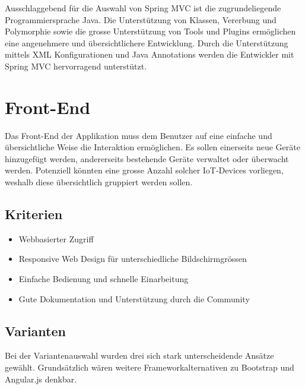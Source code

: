 Ausschlaggebend für die Auswahl von Spring MVC ist die zugrundeliegende Programmiersprache Java. Die Unterstützung von Klassen, Vererbung und Polymorphie sowie die grosse Unterstützung von Tools und Plugins ermöglichen eine angenehmere und übersichtlichere Entwicklung. Durch die Unterstützung mittels XML Konfigurationen und Java Annotations werden die Entwickler mit Spring MVC hervorragend unterstützt.

\newpage
\section{Front-End}
Das Front-End der Applikation muss dem Benutzer auf eine einfache und übersichtliche Weise die Interaktion ermöglichen. Es sollen einerseits neue Geräte hinzugefügt werden, andererseits bestehende Geräte verwaltet oder überwacht werden. Potenziell könnten eine grosse Anzahl solcher IoT-Devices vorliegen, weshalb diese übersichtlich gruppiert werden sollen.

\subsection{Kriterien}
\begin{itemize}
\item Webbasierter Zugriff
\item Responsive Web Design für unterschiedliche Bildschirmgrössen
\item Einfache Bedienung und schnelle Einarbeitung
\item Gute Dokumentation und Unterstützung durch die Community
\end{itemize}

\subsection{Varianten}
Bei der Variantenauswahl wurden drei sich stark unterscheidende Ansätze gewählt. Grundsätzlich wären weitere Frameworkalternativen zu Bootstrap und Angular.js denkbar.

